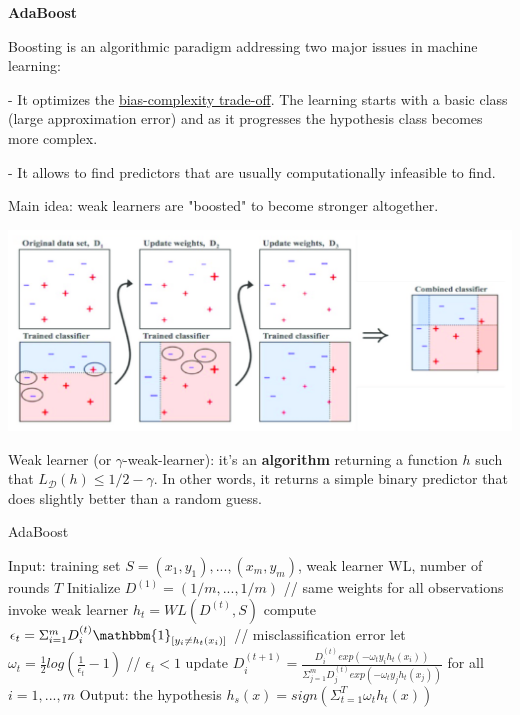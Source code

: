{\fontsize{12pt}{22pt} \textbf{AdaBoost}\par}

\vspace{5mm}

Boosting is an algorithmic paradigm addressing two major issues in machine learning:

- It optimizes the \hyperref[sec:bias-complexity-trade-off]{bias-complexity trade-off}. The learning starts with a basic class (large approximation error) and as it progresses the hypothesis class becomes more complex.

- It allows to find predictors that are usually computationally infeasible to find.

\vspace{5mm}

Main idea: weak learners are "boosted" to become stronger altogether.

\begin{center}
\includegraphics[scale=0.3]{AdaBoost_Schema.png}
\end{center}

Weak learner (or $\gamma$-weak-learner): it's an \textbf{algorithm} returning a function $h$ such that $L_{\mathcal{D}}(h) \leq 1/2 - \gamma$. In other words, it returns a simple binary predictor that does slightly better than a random guess.

\vspace{5mm}

\begin{algorithm}
\caption{AdaBoost}
\begin{algorithmic}
\State Input: training set $S=(x_1,y_1),...,(x_m,y_m)$, weak learner WL, number of rounds $T$
\State Initialize $D^{(1)} = (1/m,...,1/m)$ // same weights for all observations
\State invoke weak learner $h_t = WL(D^{(t)},S)$
\State compute $\epsilon_t = \Sigma_{i=1}^m D_i^{(t)} \mathbbm{1}_{[y_i \neq h_t(x_i)]}$ // misclassification error
\State let $\omega_t = \frac{1}{2} log(\frac{1}{\epsilon_t}-1)$ // $\epsilon_t < 1$
\State update $D_i^{(t+1)} = \frac{D_i^{(t)} exp(-\omega_t y_i h_t(x_i))}{\Sigma_{j=1}^m D_j^{(t)} exp(-\omega_t y_j h_t(x_j))}$ for all $i=1,...,m$
\EndFor
\State Output: the hypothesis $h_s(x) = sign(\Sigma_{t=1}^T \omega_t h_t (x))$
\end{algorithmic}
\end{algorithm}

